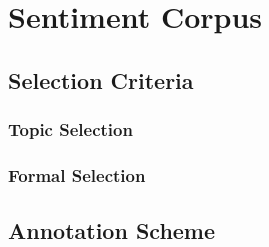 

\section{Sentiment Corpus}\label{sec:corpus}
\subsection{Selection Criteria}
\subsubsection{Topic Selection}
\subsubsection{Formal Selection}

\subsection{Annotation Scheme}
